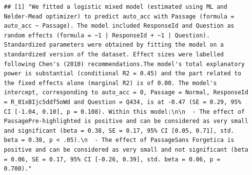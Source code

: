 \documentclass[pdf]{apa6}
\newenvironment{Shaded}{\begin{snugshade}}{\end{snugshade}}
\newcommand{\CommentTok}[1]{\textcolor[rgb]{0.56,0.35,0.01}{\textit{#1}}}
\newcommand{\DataTypeTok}[1]{\textcolor[rgb]{0.13,0.29,0.53}{#1}}
\newcommand{\DecValTok}[1]{\textcolor[rgb]{0.00,0.00,0.81}{#1}}
\newcommand{\KeywordTok}[1]{\textcolor[rgb]{0.13,0.29,0.53}{\textbf{#1}}}
\newcommand{\NormalTok}[1]{#1}
\newcommand{\OperatorTok}[1]{\textcolor[rgb]{0.81,0.36,0.00}{\textbf{#1}}}
\newcommand{\StringTok}[1]{\textcolor[rgb]{0.31,0.60,0.02}{#1}}
\begin{document}
\begin{Shaded}
\end{Shaded}

\begin{verbatim}
## [1] "We fitted a logistic mixed model (estimated using ML and Nelder-Mead optimizer) to predict auto_acc with Passage (formula = auto_acc ~ Passage). The model included ResponseId and Question as random effects (formula = ~1 | ResponseId + ~1 | Question). Standardized parameters were obtained by fitting the model on a standardized version of the dataset. Effect sizes were labelled following Chen's (2010) recommendations.The model's total explanatory power is substantial (conditional R2 = 0.45) and the part related to the fixed effects alone (marginal R2) is of 0.00. The model's intercept, corresponding to auto_acc = 0, Passage = Normal, ResponseId = R_01xBIjc5ddf5oWd and Question = Q434, is at -0.47 (SE = 0.29, 95% CI [-1.04, 0.10], p = 0.108). Within this model:\n\n  - The effect of PassagePre-highlighted is positive and can be considered as very small and significant (beta = 0.38, SE = 0.17, 95% CI [0.05, 0.71], std. beta = 0.38, p < .05).\n  - The effect of PassageSans Forgetica is positive and can be considered as very small and not significant (beta = 0.06, SE = 0.17, 95% CI [-0.26, 0.39], std. beta = 0.06, p = 0.700)."
\end{verbatim}
\end{document}
